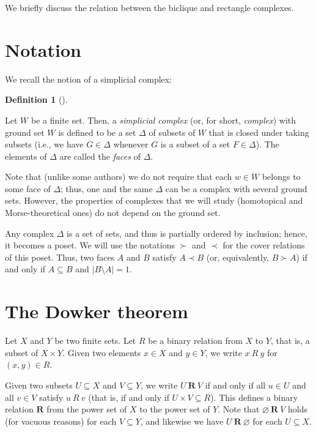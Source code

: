 \documentclass[numbers=enddot,12pt,final,onecolumn,notitlepage]{scrartcl}%
\theoremstyle{definition}
\newtheorem{defi}[theo]{Definition}
\newenvironment{definition}[1][]
{\begin{defi}[#1]\begin{leftbar}}
{\end{leftbar}\end{defi}}
\begin{document}
We briefly discuss the relation between the biclique and rectangle complexes.

\section{Notation}

We recall the notion of a simplicial complex:

\begin{definition}
Let $W$ be a finite set. Then, a \emph{simplicial complex} (or, for short,
\emph{complex}) with ground set $W$ is defined to be a set $\Delta$ of subsets
of $W$ that is closed under taking subsets (i.e., we have $G\in\Delta$
whenever $G$ is a subset of a set $F\in\Delta$). The elements of $\Delta$ are
called the \emph{faces} of $\Delta$.
\end{definition}

Note that (unlike some authors) we do not require that each $w\in W$ belongs
to some face of $\Delta$; thus, one and the same $\Delta$ can be a complex
with several ground sets. However, the properties of complexes that we will
study (homotopical and Morse-theoretical ones) do not depend on the ground set.

Any complex $\Delta$ is a set of sets, and thus is partially ordered by
inclusion; hence, it becomes a poset. We will use the notations $\succ$ and
$\prec$ for the cover relations of this poset. Thus, two faces $A$ and $B$
satisfy $A\prec B$ (or, equivalently, $B\succ A$) if and only if $A\subseteq
B$ and $\left\vert B\setminus A\right\vert =1$.

\section{The Dowker theorem}

Let $X$ and $Y$ be two finite sets. Let $R$ be a binary relation from $X$ to
$Y$, that is, a subset of $X\times Y$. Given two elements $x\in X$ and $y\in
Y$, we write $x\ R\ y$ for $\left(  x,y\right)  \in R$.

Given two subsets $U\subseteq X$ and $V\subseteq Y$, we write $U\ \mathbf{R}%
\ V$ if and only if all $u\in U$ and all $v\in V$ satisfy $u\ R\ v$ (that is,
if and only if $U\times V\subseteq R$). This defines a binary relation
$\mathbf{R}$ from the power set of $X$ to the power set of $Y$. Note that
$\varnothing\ \mathbf{R}\ V$ holds (for vacuous reasons) for each $V\subseteq
Y$, and likewise we have $U\ \mathbf{R}\ \varnothing$ for each $U\subseteq X$.
\end{document}
